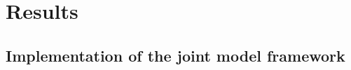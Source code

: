 \documentclass[a4,12pt]{article}
\begin{document}

 




\section{Results}


    \subsection{Implementation of the joint model framework}

\end{document}
